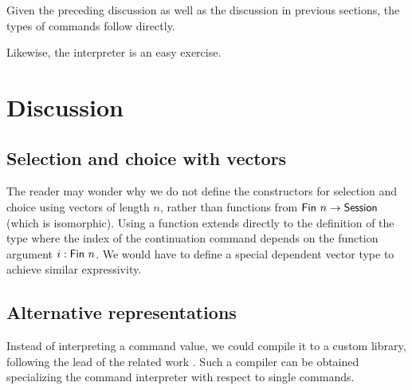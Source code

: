 \documentclass[acmsmall,review,anonymous,screen]{acmart}
\begin{document}
Given the preceding discussion as well as the discussion in previous
sections, the types of commands follow directly.

\multiCmd

Likewise, the interpreter {\Aexec} is an easy exercise.

\multiExec


\section{Discussion}
\label{sec:discussion}



\subsection{Selection and choice with vectors}
\label{sec:select-choice-with}

The reader may wonder why we do not define the constructors for
selection and choice using vectors of length $n$, rather than
functions from $\AFin~n \to \ASession$ (which is isomorphic). Using a function extends
directly to the definition of the {\ACommand} type where the {\ASession} index of the
continuation command depends on the function argument $i : \AFin~n$.
We would have to define a special dependent vector type to achieve similar
expressivity. 

\subsection{Alternative representations}
\label{sec:code-generation}

Instead of interpreting a command value, we could compile it to a
custom library, following the lead of the related work
\cite{DBLP:journals/pacmpl/00020HNY20,DBLP:conf/cc/Miu0Y021}.
Such a compiler can be obtained specializing the command interpreter
with respect to single commands.
\end{document}
